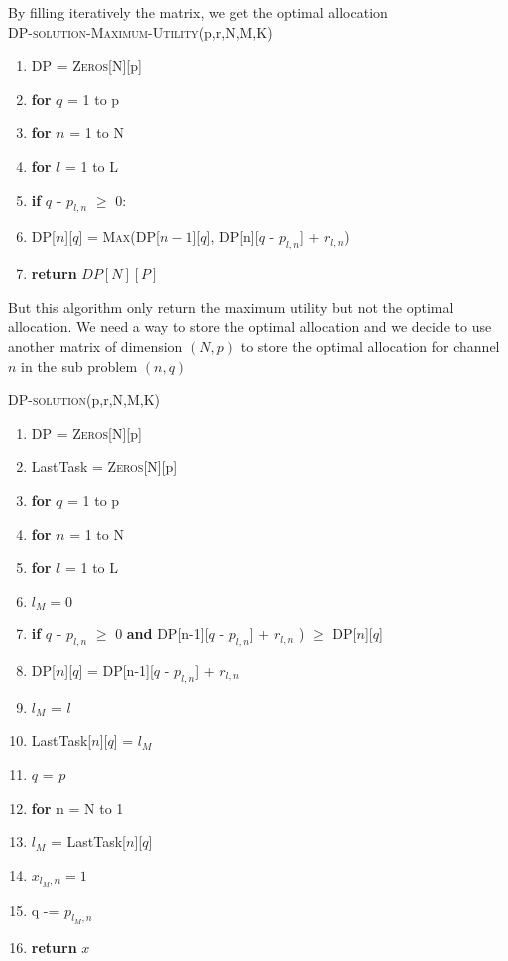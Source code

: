 \documentclass[11pt, oneside]{report}
\begin{document}
By filling iteratively the matrix, we get the optimal allocation\\

\noindent\textsc{DP-solution-Maximum-Utility}(p,r,N,M,K)
\begin{enumerate}[1\ ]
\setlength{\topsep}{0.05ex}
\setlength{\itemsep}{0.05ex}
\item DP = \textsc{Zeros}[N][p]
\item \textbf{for} $q$ = 1 to p
\item \qquad \textbf{for} $n$ = 1 to N
\item \qquad \qquad \textbf{for} $l$ = 1 to L
\item \qquad \qquad \qquad \textbf{if} $q$ - $p_{l,n}$ $\geq$ 0:
\item \qquad \qquad \qquad \qquad DP[$n$][$q$] = \textsc{Max}(DP[$n-1$][$q$], DP[n][$q$ - $p_{l,n}$] + $r_{l,n}$)
\item \textbf{return} $DP[N][P]$
\end{enumerate}

But this algorithm only return the maximum utility but not the optimal allocation. We need a way to store the optimal allocation and we decide to use another matrix of dimension $(N,p)$ to store the optimal allocation for channel $n$ in the sub problem $(n,q)$

\noindent\textsc{DP-solution}(p,r,N,M,K)
\begin{enumerate}[1\ ]
\setlength{\topsep}{0.05ex}
\setlength{\itemsep}{0.05ex}
\item DP = \textsc{Zeros}[N][p]
\item LastTask = \textsc{Zeros}[N][p]
\item \textbf{for} $q$ = 1 to p
\item \qquad \textbf{for} $n$ = 1 to N
\item \qquad \qquad \textbf{for} $l$ = 1 to L
\item \qquad \qquad \qquad $l_M = 0$
\item \qquad \qquad \qquad \textbf{if} $q$ - $p_{l,n}$ $\geq$ 0 \textbf{and} DP[n-1][$q$ - $p_{l,n}$] + $r_{l,n}$ ) $\geq$ DP[$n$][$q$]
\item \qquad \qquad \qquad \qquad DP[$n$][$q$] = DP[n-1][$q$ - $p_{l,n}$] + $r_{l,n}$
\item \qquad \qquad \qquad \qquad $l_M$ = $l$
\item \qquad \qquad LastTask[$n$][$q$] = $l_M$
\item $q$ = $p$
\item \textbf{for} n = N to 1
\item \qquad $l_M$ = LastTask[$n$][$q$]
\item \qquad $x_{l_M, n} = 1$
\item \qquad q -= $p_{l_M, n}$
\item \textbf{return} $x$
\end{enumerate}
\end{document}
